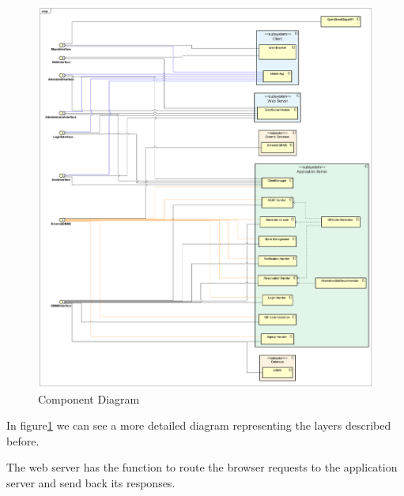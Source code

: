 \documentclass[table, 12pt]{article}
\begin{document}
\begin{figure}[H]
    \begin{center}
        \includegraphics[width=\textwidth]{assets/Architectural-Design/ComponentDiagram.png}
        \caption{Component Diagram}\label{component_diagram}
    \end{center}
\end{figure}

In figure\ref{component_diagram} we can see a more detailed diagram representing the layers described before.

The web server has the function to route the browser requests to the application server and send back its responses.
\end{document}
